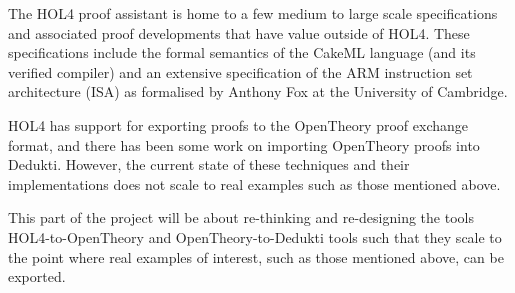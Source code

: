 

The HOL4 proof assistant is home to a few medium to large scale
specifications and associated proof developments that have value
outside of HOL4. These specifications include the formal semantics of
the CakeML language (and its verified compiler) and an extensive
specification of the ARM instruction set architecture (ISA) as
formalised by Anthony Fox at the University of Cambridge.

HOL4 has support for exporting proofs to the OpenTheory proof exchange
format, and there has been some work on importing OpenTheory proofs
into Dedukti. However, the current state of these techniques and their
implementations does not scale to real examples such as those
mentioned above.

This part of the project will be about re-thinking and re-designing
the tools HOL4-to-OpenTheory and OpenTheory-to-Dedukti tools such that
they scale to the point where real examples of interest, such as those
mentioned above, can be exported.


